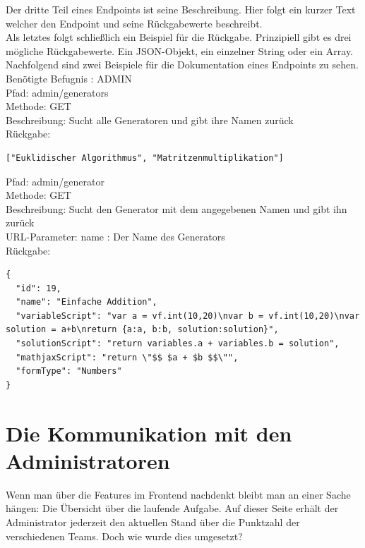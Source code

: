 Der dritte Teil eines Endpoints ist seine Beschreibung. Hier folgt ein kurzer Text welcher den Endpoint und seine Rückgabewerte beschreibt. \\

Als letztes folgt schließlich ein Beispiel für die Rückgabe. Prinzipiell gibt es drei mögliche Rückgabewerte. Ein JSON-Objekt, ein einzelner String oder ein Array. \\

Nachfolgend sind zwei Beispiele für die Dokumentation eines Endpoints zu sehen. \\

Benötigte Befugnis : ADMIN \\

\noindent Pfad: admin/generators \\
Methode: GET \\
Beschreibung: Sucht alle Generatoren und gibt ihre Namen zurück \\
Rückgabe: \begin{lstlisting} 
["Euklidischer Algorithmus", "Matritzenmultiplikation"]
\end{lstlisting}

\noindent Pfad: admin/generator \\
Methode: GET \\
Beschreibung: Sucht den Generator mit dem angegebenen Namen und gibt ihn zurück \\
URL-Parameter: name : Der Name des Generators \\
Rückgabe: \begin{lstlisting} 
{
  "id": 19,
  "name": "Einfache Addition",
  "variableScript": "var a = vf.int(10,20)\nvar b = vf.int(10,20)\nvar solution = a+b\nreturn {a:a, b:b, solution:solution}",
  "solutionScript": "return variables.a + variables.b = solution",
  "mathjaxScript": "return \"$$ $a + $b $$\"",
  "formType": "Numbers"
}
\end{lstlisting}

\section{Die Kommunikation mit den Administratoren}

Wenn man über die Features im Frontend nachdenkt bleibt man an einer Sache hängen: Die Übersicht über die laufende Aufgabe. Auf dieser Seite erhält der Administrator jederzeit den aktuellen Stand über die Punktzahl der verschiedenen Teams. Doch wie wurde dies umgesetzt? \\

